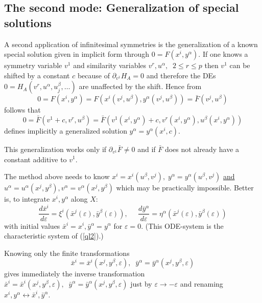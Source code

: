 \documentclass[12pt]{article}
\begin{document}
\subsection{The second mode: Generalization of special solutions}
A second application of infinitesimal symmetries is the generalization
of a known special solution given in implicit form through
$0 = F(x^i,y^\alpha)$. If one knows a symmetry variable $v^1$ and
similarity variables $v^r, u^\alpha,\;\;2\leq r\leq p$ then
$v^1$ can be shifted by a constant $c$ because of
$\partial_{v^1}H_A = 0$ and
therefore the DEs $0 = H_A(v^r,u^\alpha,u^\beta_j,\ldots)$
are unaffected by the shift. Hence from
\[0 = F(x^i, y^\alpha) = F(x^i(v^j,u^\beta), y^\alpha(v^j,u^\beta)) =
\bar{F}(v^j,u^\beta)\] follows that
\[ 0 = \bar{F}(v^1+c,v^r,u^\beta) =
\bar{F}(v^1(x^i,y^\alpha)+c, v^r(x^i,y^\alpha), u^\beta(x^i,y^\alpha))\]
defines implicitly a generalized solution $y^\alpha=y^\alpha(x^i,c)$.

This generalization works only if $\partial_{v^1}\bar{F} \neq 0$ and
if $\bar{F}$ does not already have
a constant additive to $v^1$.

The method above needs to know $x^i=x^i(u^\beta,v^j),\;
y^\alpha=y^\alpha(u^\beta,v^j)$ \underline{and}
$u^\alpha = u^\alpha(x^j,y^\beta), v^\alpha = v^\alpha(x^j,y^\beta)$
which may be practically impossible.
Better is, to integrate $x^i,y^\alpha$ along $X$:
\begin{equation}
\frac{d\bar{x}^i}{d\varepsilon} = \xi^i(\bar{x}^j(\varepsilon),
                                  \bar{y}^\beta(\varepsilon)), \;\;\;\;\;
\frac{d\bar{y}^\alpha}{d\varepsilon} = \eta^\alpha(\bar{x}^j(\varepsilon),
                                       \bar{y}^\beta(\varepsilon))
\label{ODEsys}
\end{equation}
with initial values $\bar{x}^i = x^i, \bar{y}^\alpha = y^\alpha$
for $\varepsilon = 0.$
(This ODE-system is the characteristic system of (\ref{ql2}).)

Knowing only the finite transformations
\begin{equation}
\bar{x}^i = \bar{x}^i(x^j,y^\beta,\varepsilon),\;\;
\bar{y}^\alpha = \bar{y}^\alpha(x^j,y^\beta,\varepsilon)  \label{ODEsol}
\end{equation}
gives immediately the inverse transformation
$\bar{x}^i = \bar{x}^i(x^j,y^\beta,\varepsilon),\;\;
\bar{y}^\alpha = \bar{y}^\alpha(x^j,y^\beta,\varepsilon)$
just by $\varepsilon \rightarrow -\varepsilon$ and renaming
$x^i,y^\alpha \leftrightarrow \bar{x}^i,\bar{y}^\alpha.$
\end{document}
